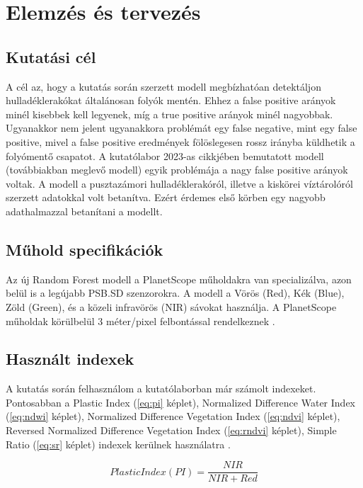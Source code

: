 \chapter{Elemzés és tervezés}
\label{ch:spec}

\section{Kutatási cél}
\label{ch:goals}

A cél az, hogy a kutatás során szerzett modell megbízhatóan detektáljon hulladéklerakókat általánosan folyók mentén. Ehhez a false positive arányok minél kisebbek kell legyenek, míg a true positive arányok minél nagyobbak. Ugyanakkor nem jelent ugyanakkora problémát egy false negative, mint egy false positive, mivel a false positive eredmények fölöslegesen rossz irányba küldhetik a folyómentő csapatot. 
A kutatólabor 2023-as cikkjében bemutatott modell (továbbiakban meglevő modell) egyik problémája a nagy false positive arányok voltak. A modell a pusztazámori hulladéklerakóról, illetve a kiskörei víztárolóról szerzett adatokkal volt betanítva. Ezért érdemes első körben egy nagyobb adathalmazzal betanítani a modellt.

\section{Műhold specifikációk}

Az új Random Forest modell a PlanetScope műholdakra van specializálva, azon belül is a legújabb PSB.SD szenzorokra. A modell a Vörös (Red), Kék (Blue), Zöld (Green), és a közeli infravörös (NIR) sávokat használja. A PlanetScope műholdak körülbelül 3 méter/pixel felbontással rendelkeznek \cite{planetsensors2024}.

\section{Használt indexek}

A kutatás során felhasználom a kutatólaborban már számolt indexeket. Pontosabban a Plastic Index (\ref{eq:pi} képlet), Normalized Difference Water Index (\ref{eq:ndwi} képlet), Normalized Difference Vegetation Index (\ref{eq:ndvi} képlet), Reversed Normalized Difference Vegetation Index (\ref{eq:rndvi} képlet), Simple Ratio (\ref{eq:sr} képlet) indexek kerülnek használatra \cite{Themistocleous2020, magyar2023}.

\begin{equation}\label{eq:pi}
    Plastic Index (PI) = \frac{NIR}{NIR + Red}
\end{equation}

